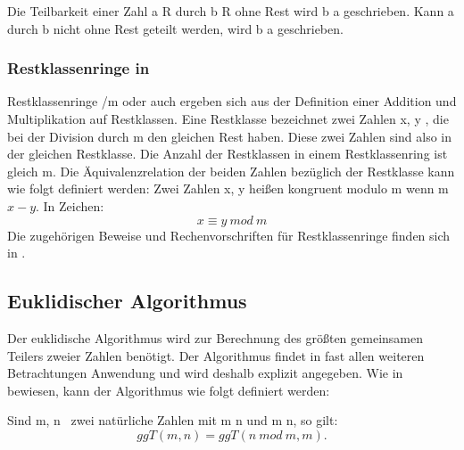 			Die Teilbarkeit einer Zahl a \myin R durch b \myin R ohne Rest wird b \myTeiler a geschrieben. Kann a durch b nicht ohne Rest geteilt werden, wird b \myNichtTeiler a geschrieben.
		
		\subsubsection{Restklassenringe in }
			Restklassenringe \myMenge{Z}/m oder auch  ergeben sich aus der Definition einer Addition und Multiplikation auf Restklassen. Eine Restklasse bezeichnet zwei Zahlen x, y \myin {}, die bei der Division durch m \myin {} den gleichen Rest haben. Diese zwei Zahlen sind also in der gleichen Restklasse. Die Anzahl der Restklassen in einem Restklassenring ist gleich m. Die Äquivalenzrelation der beiden Zahlen bezüglich der Restklasse kann wie folgt definiert werden:
			Zwei Zahlen x, y \myin {} heißen kongruent modulo m \myin {} wenn m \myTeiler $x-y$. In Zeichen:
			\begin{displaymath}
				x \equiv y~mod~m
			\end{displaymath}	
			Die zugehörigen Beweise und Rechenvorschriften für Restklassenringe finden sich in \cite{Algorithmische:Zahlentheorie}.
			
		\subsection{Euklidischer Algorithmus}
			Der euklidische Algorithmus wird zur Berechnung des größten gemeinsamen Teilers zweier Zahlen benötigt. Der Algorithmus findet in fast allen weiteren Betrachtungen Anwendung und wird deshalb explizit angegeben. Wie in \cite{Diskrete:Strukturen} bewiesen, kann der Algorithmus wie folgt definiert werden:
			
			Sind m, n \myin {}\ zwei natürliche Zahlen mit m \myKleinerGleich n und m \myNichtTeiler n, so gilt:
			\begin{displaymath}
				ggT(m, n) = ggT(n~mod~m, m).
			\end{displaymath}
						
